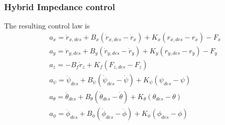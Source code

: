 \begin{frame}
  \frametitle{Hybrid Impedance control}
  The resulting control law is
  \begin{align*}
    & a_x = \ddot{r}_{x,des} + B_x (\dot{r}_{x,des} - \dot{r}_x) + K_x (r_{x,des} - r_x) - F_x \\
    & a_y = \ddot{r}_{y,des} + B_y (\dot{r}_{y,des} - \dot{r}_y) + K_y (r_{y,des} - r_y) - F_y \\
    & a_z = - B_f \dot{r}_z + K_f(F_{z,des} - F_z) \\
    & a_{\psi} = \ddot{\psi}_{des} + B_{\psi}(\dot{\psi}_{des} - \dot{\psi}) + K_{\psi} (\psi_{des} - \psi) \\
    & a_{\theta} = \ddot{\theta}_{des} + B_{\theta}(\dot{\theta}_{des} - \dot{\theta}) + K_{\theta} (\theta_{des} - \theta) \\
    & a_{\phi} = \ddot{\phi}_{des} + B_{\phi}(\dot{\phi}_{des} - \dot{\phi}) + K_{\phi} (\phi_{des} - \phi) \\
  \end{align*}
\end{frame}
